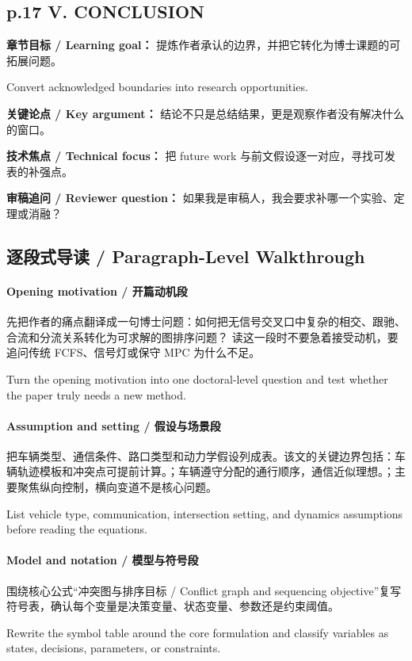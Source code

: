 \documentclass[UTF8,a4paper,11pt,fontset=fandol]{ctexart}
\begin{document}
\subsection*{p.17 V. CONCLUSION}
\textbf{章节目标 / Learning goal：} 提炼作者承认的边界，并把它转化为博士课题的可拓展问题。

Convert acknowledged boundaries into research opportunities.

\textbf{关键论点 / Key argument：} 结论不只是总结结果，更是观察作者没有解决什么的窗口。

\textbf{技术焦点 / Technical focus：} 把 future work 与前文假设逐一对应，寻找可发表的补强点。

\textbf{审稿追问 / Reviewer question：} 如果我是审稿人，我会要求补哪一个实验、定理或消融？


\subsection{逐段式导读 / Paragraph-Level Walkthrough}
\paragraph{Opening motivation / 开篇动机段}先把作者的痛点翻译成一句博士问题：如何把无信号交叉口中复杂的相交、跟驰、合流和分流关系转化为可求解的图排序问题？ 读这一段时不要急着接受动机，要追问传统 FCFS、信号灯或保守 MPC 为什么不足。

Turn the opening motivation into one doctoral-level question and test whether the paper truly needs a new method.

\paragraph{Assumption and setting / 假设与场景段}把车辆类型、通信条件、路口类型和动力学假设列成表。该文的关键边界包括：车辆轨迹模板和冲突点可提前计算。；车辆遵守分配的通行顺序，通信近似理想。；主要聚焦纵向控制，横向变道不是核心问题。

List vehicle type, communication, intersection setting, and dynamics assumptions before reading the equations.

\paragraph{Model and notation / 模型与符号段}围绕核心公式“冲突图与排序目标 / Conflict graph and sequencing objective”复写符号表，确认每个变量是决策变量、状态变量、参数还是约束阈值。

Rewrite the symbol table around the core formulation and classify variables as states, decisions, parameters, or constraints.
\end{document}
